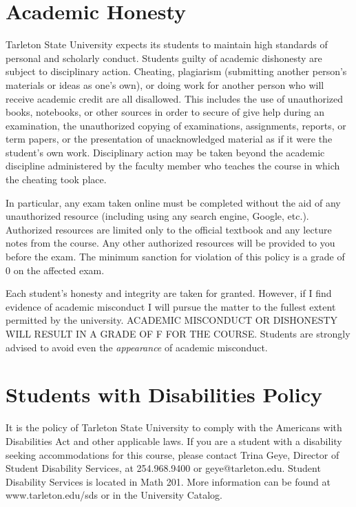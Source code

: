 \documentclass[10pt]{article}
\begin{document}
\section*{Academic Honesty}
\label{sec-8}

Tarleton State University expects its students to maintain high standards of
personal and scholarly conduct. Students guilty of academic dishonesty are
subject to disciplinary action. Cheating, plagiarism (submitting another person’s materials or ideas as one’s own), or doing work for another person who will receive academic credit are all disallowed. This includes the use of unauthorized books, notebooks, or other sources in order to secure of give help during an examination, the unauthorized copying of examinations, assignments, reports, or term papers, or the presentation of unacknowledged material as if it were the student’s own work. Disciplinary action may be taken beyond the academic discipline administered by the faculty member who teaches the course in which the cheating took place.

In particular, any exam taken online must be completed without the aid of any unauthorized resource (including using any search engine, Google, etc.).  Authorized resources are limited only to the official textbook and any lecture notes from the course.  Any other authorized resources will be provided to you before the exam.  The minimum sanction for violation of this policy is a grade of 0 on the affected exam.

Each student’s honesty and integrity are taken for granted. However, if I find
evidence of academic misconduct I will pursue the matter
to the fullest extent permitted by the university. ACADEMIC MISCONDUCT OR
DISHONESTY WILL RESULT IN A GRADE OF F FOR THE COURSE.  Students are
strongly advised to avoid even the \emph{appearance} of academic misconduct. 

\section*{Students with Disabilities Policy}
\label{sec-9}

It is the policy of Tarleton State University to comply with the Americans
with Disabilities Act and other applicable laws. If you are a student with a
disability seeking accommodations for this course, please contact Trina
Geye, Director of Student Disability Services, at 254.968.9400 or
geye@tarleton.edu. Student Disability Services is
located in Math 201. More information can be found at www.tarleton.edu/sds or in the University Catalog.
\end{document}
